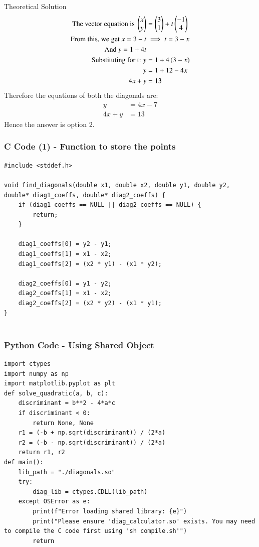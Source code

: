 \documentclass{beamer}
\begin{document}
\begin{frame}{Theoretical Solution}
\begin{align}
    \text{The vector equation is } \begin{pmatrix}x\\y\end{pmatrix} &= \begin{pmatrix}3\\1\end{pmatrix} + t\begin{pmatrix}-1\\4\end{pmatrix} \\
    \text{From this, we get } x = 3 - t &\implies t = 3-x \\
    \text{And } y = 1 + 4t \\
    \text{Substituting for t: } y &= 1 + 4\left(3-x\right) \\
    y &= 1 + 12 - 4x \\
    4x + y &= 13\\
\end{align}
    Therefore the equations of both the diagonals are:
    \begin{align}
    y &= 4x - 7 \\
    4x + y &= 13
    \end{align}
    Hence the answer is option 2.

\end{frame}
\begin{frame}[fragile]
    \frametitle{C Code (1) - Function to store the points }

    \begin{lstlisting}
#include <stddef.h>

void find_diagonals(double x1, double x2, double y1, double y2, double* diag1_coeffs, double* diag2_coeffs) {
    if (diag1_coeffs == NULL || diag2_coeffs == NULL) {
        return;
    }

    diag1_coeffs[0] = y2 - y1;
    diag1_coeffs[1] = x1 - x2;
    diag1_coeffs[2] = (x2 * y1) - (x1 * y2);

    diag2_coeffs[0] = y1 - y2;
    diag2_coeffs[1] = x1 - x2;
    diag2_coeffs[2] = (x2 * y2) - (x1 * y1);
}


    \end{lstlisting}
\end{frame}

\begin{frame}[fragile]
    \frametitle{Python Code - Using Shared Object}
    \begin{lstlisting}
import ctypes
import numpy as np
import matplotlib.pyplot as plt
def solve_quadratic(a, b, c):
    discriminant = b**2 - 4*a*c
    if discriminant < 0:
        return None, None
    r1 = (-b + np.sqrt(discriminant)) / (2*a)
    r2 = (-b - np.sqrt(discriminant)) / (2*a)
    return r1, r2
def main():
    lib_path = "./diagonals.so"
    try:
        diag_lib = ctypes.CDLL(lib_path)
    except OSError as e:
        print(f"Error loading shared library: {e}")
        print("Please ensure 'diag_calculator.so' exists. You may need to compile the C code first using 'sh compile.sh'")
        return
\end{lstlisting}
\end{frame}
\end{document}

